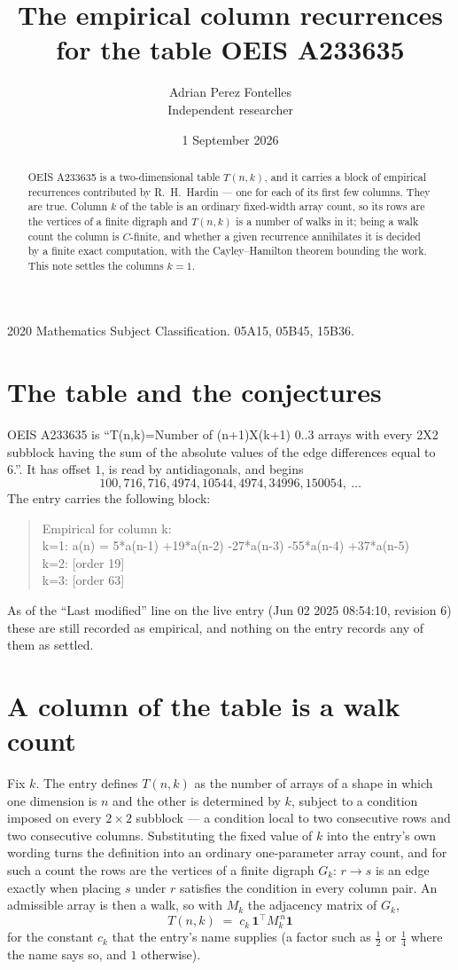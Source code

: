 \documentclass[11pt,a4paper]{article}
\title{The empirical column recurrences for the table OEIS A233635}
\author{Adrian Perez Fontelles\\ \small Independent researcher}
\date{1 September 2026}
\theoremstyle{plain}
\theoremstyle{definition}
\begin{document}
\maketitle

\begin{abstract}
OEIS A233635 is a two-dimensional table $T(n,k)$, and it carries a block of empirical
recurrences contributed by R.~H.~Hardin --- one for each of its first few columns. They are
true. Column $k$ of the table is an ordinary fixed-width array count, so its rows are the
vertices of a finite digraph and $T(n,k)$ is a number of walks in it; being a walk count the
column is $C$-finite, and whether a given recurrence annihilates it is decided by a finite
exact computation, with the Cayley--Hamilton theorem bounding the work. This note settles the
columns $k=1$.
\end{abstract}

\noindent\small 2020 Mathematics Subject Classification. 05A15, 05B45, 15B36.\normalsize

\section{The table and the conjectures}

OEIS A233635 is ``T(n,k)=Number of (n+1)X(k+1) 0..3 arrays with every 2X2 subblock having the sum of the absolute values of the edge differences equal to 6.''. It has offset $1$, is
read by antidiagonals, and begins
\[
100, 716, 716, 4974, 10544, 4974, 34996, 150054,\ \dots
\]
The entry carries the following block:
\begin{quote}\small
Empirical for column k:\\
k=1: a(n) = 5*a(n-1) +19*a(n-2) -27*a(n-3) -55*a(n-4) +37*a(n-5)\\
k=2: [order 19]\\
k=3: [order 63]\\
\end{quote}
As of the ``Last modified'' line on the live entry (Jun 02 2025 08:54:10, revision 6) these are still
recorded as empirical, and nothing on the entry records any of them as settled.

\section{A column of the table is a walk count}

Fix $k$. The entry defines $T(n,k)$ as the number of arrays of a shape in which one dimension
is $n$ and the other is determined by $k$, subject to a condition imposed on every
$2\times2$ subblock --- a condition local to two consecutive rows and two consecutive columns.
Substituting the fixed value of $k$ into the entry's own wording turns the definition into an
ordinary one-parameter array count, and for such a count the rows are the vertices of a finite
digraph $G_k$: $r\to s$ is an edge exactly when placing $s$ under $r$ satisfies the condition
in every column pair. An admissible array is then a walk, so with $M_k$ the adjacency matrix
of $G_k$,
\[
T(n,k)\;=\;c_k\,\mathbf{1}^{\!\top}M_k^{\,n}\mathbf{1}
\]
for the constant $c_k$ that the entry's name supplies (a factor such as $\tfrac12$ or
$\tfrac14$ where the name says so, and $1$ otherwise).
\end{document}

